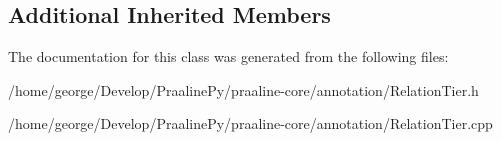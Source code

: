 \subsection*{Additional Inherited Members}


The documentation for this class was generated from the following files\+:\begin{DoxyCompactItemize}
\item 
/home/george/\+Develop/\+Praaline\+Py/praaline-\/core/annotation/Relation\+Tier.\+h\item 
/home/george/\+Develop/\+Praaline\+Py/praaline-\/core/annotation/Relation\+Tier.\+cpp\end{DoxyCompactItemize}
